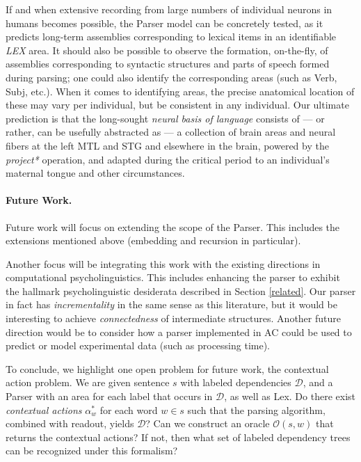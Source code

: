 \documentclass[11pt,a4paper]{article}
\begin{document}
If and when extensive recording from large numbers of individual neurons in humans becomes possible, the Parser model can be concretely tested, as it predicts long-term assemblies corresponding to lexical items in an identifiable {\em LEX} area. It should also be possible to observe the formation, on-the-fly, of assemblies corresponding to syntactic structures and parts of speech formed during parsing; one could also identify the corresponding areas (such as {\sc Verb}, {\sc Subj}, etc.). When it comes to identifying areas, the precise anatomical location of these may vary per individual, but be consistent in any individual.  Our ultimate prediction is that the long-sought {\em neural basis of language} consists of --- or rather, can be usefully abstracted as --- a collection of brain areas and neural fibers at the left MTL and STG and elsewhere in the brain, powered by the {\em project*} operation, and adapted during the critical period to an individual's maternal tongue and other circumstances.

\paragraph{Future Work.} Future work will focus on extending the scope of the Parser. This includes the extensions mentioned above (embedding and recursion in particular). 

 Another focus will be integrating this work with the existing directions in computational psycholinguistics. This includes enhancing the parser to exhibit the hallmark psycholinguistic desiderata described in Section \ref{related}. Our parser in fact has {\em incrementality} in the same sense as this literature, but it would be interesting to achieve {\em connectedness} of intermediate structures. Another future direction would be to consider how a parser implemented in AC could be used to predict or model experimental data (such as processing time). 

To conclude, we highlight one open problem for future work, the contextual action problem. We are given sentence $s$ with labeled dependencies $\mathcal{D}$, and a Parser with an area for each label that occurs in $\mathcal{D}$, as well as {\sc Lex}. Do there exist {\em contextual actions} $\alpha_w^*$ for each word $w \in s$ such that the parsing algorithm, combined with readout, yields $\mathcal{D}$? Can we construct an oracle $\mathcal{O}(s,w)$ that returns the contextual actions? If not, then what set of labeled dependency trees can be recognized under this formalism? 
\end{document}
